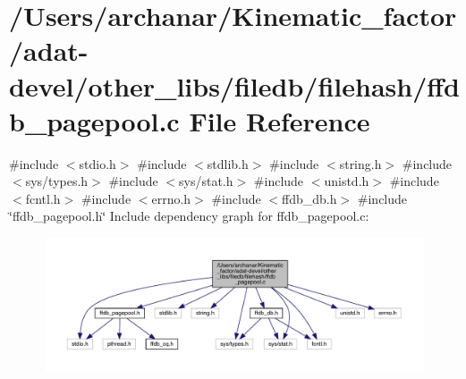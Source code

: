 \hypertarget{adat-devel_2other__libs_2filedb_2filehash_2ffdb__pagepool_8c}{}\section{/\+Users/archanar/\+Kinematic\+\_\+factor/adat-\/devel/other\+\_\+libs/filedb/filehash/ffdb\+\_\+pagepool.c File Reference}
\label{adat-devel_2other__libs_2filedb_2filehash_2ffdb__pagepool_8c}
{\ttfamily \#include $<$stdio.\+h$>$}\newline
{\ttfamily \#include $<$stdlib.\+h$>$}\newline
{\ttfamily \#include $<$string.\+h$>$}\newline
{\ttfamily \#include $<$sys/types.\+h$>$}\newline
{\ttfamily \#include $<$sys/stat.\+h$>$}\newline
{\ttfamily \#include $<$unistd.\+h$>$}\newline
{\ttfamily \#include $<$fcntl.\+h$>$}\newline
{\ttfamily \#include $<$errno.\+h$>$}\newline
{\ttfamily \#include $<$ffdb\+\_\+db.\+h$>$}\newline
{\ttfamily \#include \char`\"{}ffdb\+\_\+pagepool.\+h\char`\"{}}\newline
Include dependency graph for ffdb\+\_\+pagepool.\+c\+:
\nopagebreak
\begin{figure}[H]
\begin{center}
\leavevmode
\includegraphics[width=350pt]{de/d5a/adat-devel_2other__libs_2filedb_2filehash_2ffdb__pagepool_8c__incl}
\end{center}
\end{figure}
